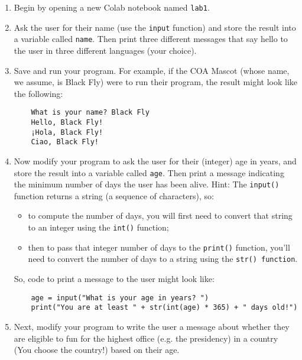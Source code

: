 \documentclass[10pt]{article}
\begin{document}
  \begin{enumerate}
    \item Begin by opening a new Colab notebook named {\tt lab1}.
    \item Ask the user for their name (use the {\tt input} function) and store
    the result into a variable called {\tt name}.
    Then print three different messages that say hello to the user in three
    different languages (your choice).
    \item Save and run your program.  For example, if the COA Mascot (whose
    name, we assume, is Black Fly) were to run their program, the result might
    look like the following:
\begin{verbatim}
    What is your name? Black Fly
    Hello, Black Fly!
    ¡Hola, Black Fly!
    Ciao, Black Fly!
\end{verbatim}

    \item Now modify your program to ask the user for their (integer) age in
    years, and store the result into a variable called {\tt age}. 
    Then print a message indicating the minimum number of days the user has
    been alive.
    \vspace*{10pt} Hint: The {\tt input()} function returns a string (a
        sequence of characters), so:
        \begin{itemize}
            \item to compute the number of days, you will first need to convert that string to an integer using the {\tt int()} function;
            \item then to pass that integer number of days to the {\tt print()}
                function, you'll need to convert the number of days to a string
                using the {\tt str() function}.
        \end{itemize}
        So, code to print a message to the user might look like:
\begin{verbatim}
    age = input("What is your age in years? ")
    print("You are at least " + str(int(age) * 365) + " days old!")
\end{verbatim}


    \item Next, modify your program to write the user a message about whether they are eligible to fun for the highest office (e.g. the presidency) in a country (You choose the country!) based on their age. 


\end{enumerate}
\end{document}
